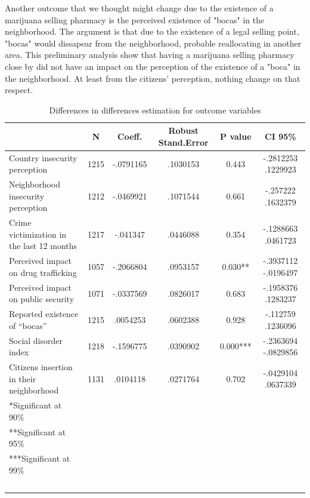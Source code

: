 \documentclass[11pt]{article}
\begin{document}
Another outcome that we thought might change due to the existence of a marijuana selling pharmacy is the perceived existence of "bocas" in the neighborhood. The argument is that due to the existence of a legal selling point, "bocas" would dissapear from the neighborhood, probable reallocating in another area. This preliminary analysis show that having a marijuana selling pharmacy close by did not have an impact on the perception of the existence of a "boca" in the neighborhood. At least from the citizens' perception, nothing change on that respect.

\begin{scriptsize}
        \begin{table}[H]
        \tiny
        \centering
        \caption{Differences in differences estimation for outcome variables}
    \label{tab:regtab}
    \begin{tabular}{lccccc}
 & \textbf{N} & \textbf{Coeff.}	&	\textbf{Robust Stand.Error}	&	\textbf{P value}	&	\textbf{CI 95\% } 		\\	\hline
Country insecurity  perception	&	1215	&	-.0791165	&	.1030153	&	0.443	&	-.2812253    	.1229923	\\	
Neighborhood insecurity perception	&	1212	&	-.0469921	&	.1071544	&	0.661	&	-.257222    	.1632379	\\
Crime victimization in the last 12 months	&	1217	&	-.041347	&	.0446088	&	0.354	&	-.1288663  	 .0461723	\\	
Perceived impact on drug trafficking &	1057	&	-.2066804 	&	.0953157	&	0.030**	&	 -.3937112  	 -.0196497	\\	
Perceived impact on public security	&	1071	&	-.0337569 	&	.0826017 	&	0.683	&	-.1958376    	.1283237	\\
Reported existence of ``bocas''	&	1215	&	.0054253	&	.0602388	&	 0.928	&	-.112759 	.1236096	\\	
Social disorder index	&	1218	&	-.1596775 	&	.0390902 	&	0.000***	&	-.2363694 	-.0829856	\\	
Citizens insertion in their neighborhood	&	1131	&	.0104118	&	.0271764	&	0.702	&	-.0429104   	 .0637339	\\	\hline
*Significant at 90\%\\
**Significant at 95\%\\
***Significant at 99\% \\~\\
        \end{tabular}
        \end{table}
    \end{scriptsize}
\end{document}
